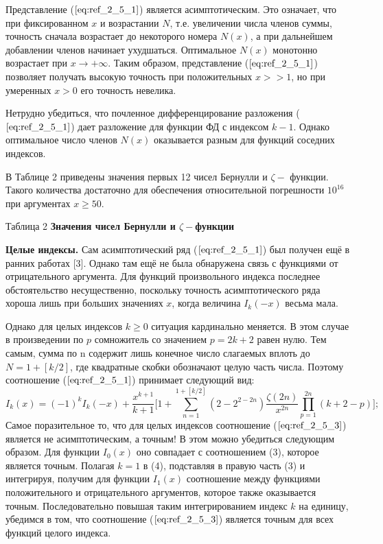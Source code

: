 Представление ($\ref{eq:ref_2_5_1}$) является асимптотическим. Это означает, что при
фиксированном $x$ и возрастании $N$, т.е. увеличении числа членов суммы,
точность сначала возрастает до некоторого номера $N(x)$, а при дальнейшем
добавлении членов начинает ухудшаться. Оптимальное $N(x)$ монотонно
возрастает при $x \to +\infty$. Таким образом, представление ($\ref{eq:ref_2_5_1}$) позволяет получать
высокую точность при положительных $x >> 1$, но при умеренных $x > 0$ его
точность невелика.

Нетрудно убедиться, что почленное дифференцирование разложения ($\ref{eq:ref_2_5_1}$)
дает разложение для функции ФД с индексом $k - 1$. Однако оптимальное
число членов $N(x)$ оказывается разным для функций соседних индексов.

В Таблице 2 приведены значения первых 12 чисел Бернулли и
$\zeta -$ функции. Такого количества достаточно для обеспечения относительной
погрешности $10^{16}$ при аргументах $x \geqslant 50$.

Таблица 2 %
\textbf{Значения чисел Бернулли и $\zeta -$функции}

\textbf{Целые индексы.} Сам асимптотический ряд ($\ref{eq:ref_2_5_1}$) был получен ещё в ранних
работах [3]. Однако там ещё не была обнаружена связь с функциями от
отрицательного аргумента. Для функций произвольного индекса последнее
обстоятельство несущественно, поскольку точность асимптотического ряда
хороша лишь при больших значениях $x$, когда величина $I_k(-x)$ весьма мала.

Однако для целых индексов $k \geqslant 0$ ситуация кардинально меняется. В этом
случае в произведении по $p$ сомножитель со значением $p = 2k + 2$ равен нулю.
Тем самым, сумма по n содержит лишь конечное число слагаемых вплоть до
$N=1+[k/2]$, где квадратные скобки обозначают целую часть числа. Поэтому
соотношение ($\ref{eq:ref_2_5_1}$) принимает следующий вид:
\begin{equation}
I_k(x) = (-1)^k I_k(-x)+ \frac{x^{k+1}}{k+1}\Bigg[ 1+\sum\limits_{n=1}^{1+[k/2]} (2-2^{2-2n}) \frac{\zeta (2n)}{x^{2n}}  \prod\limits_{p=1}^{2n} (k+2-p) \Bigg];
\label{eq:ref_2_5_3}
\end{equation}
Самое поразительное то, что для целых индексов соотношение ($\ref{eq:ref_2_5_3}$) является не
асимптотическим, а точным! В этом можно убедиться следующим образом. Для
функции $I_0(x)$ оно совпадает с соотношением (3), которое является точным.
Полагая $k=1$ в (4), подставляя в правую часть (3) и интегрируя, получим для
функции $I_1(x)$ соотношение между функциями положительного и
отрицательного аргументов, которое также оказывается точным.
Последовательно повышая таким интегрированием индекс $k$ на единицу,
убедимся в том, что соотношение ($\ref{eq:ref_2_5_3}$) является точным для всех функций
целого индекса.

